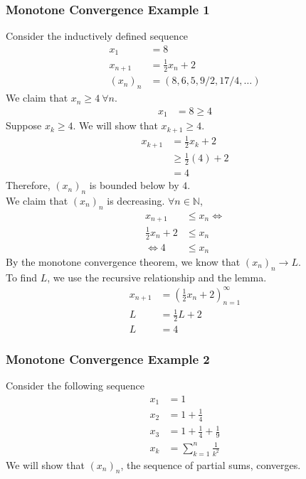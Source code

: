 \documentclass[10pt]{extarticle}
\newcommand{\N}{\mathbb{N}}
\begin{document}
    \subsubsection{Monotone Convergence Example 1}%
    Consider the inductively defined sequence
    \begin{align*}
      x_{1} &= 8\\
      x_{n+1} &= \frac{1}{2}x_n + 2\\
      (x_n)_n &= (8,6,5,9/2,17/4,\dots)
    \end{align*}
    We claim that $x_n \geq 4~\forall n$.
    \begin{align*}
      x_1 &= 8 \geq 4
    \end{align*}
    Suppose $x_k \geq 4$. We will show that $x_{k+1} \geq 4$.
    \begin{align*}
      x_{k + 1} &= \frac{1}{2}x_k + 2\\
                &\geq \frac{1}{2}(4) + 2\\
                &= 4
    \end{align*}
    Therefore, $(x_n)_n$ is bounded below by $4$.\\

    We claim that $(x_n)_n$ is decreasing. $\forall n\in\N$,
    \begin{align*}
      x_{n+1} &\leq x_n
      \Leftrightarrow \\
      \frac{1}{2}x_n + 2 &\leq x_n\\
      \Leftrightarrow
      4 &\leq x_n
    \end{align*}
    By the monotone convergence theorem, we know that $(x_n)_n\rightarrow L$.\\

    To find $L$, we use the recursive relationship and the lemma.
    \begin{align*}
      x_{n+1} &= \left(\frac{1}{2}x_n + 2\right)_{n=1}^{\infty}\\
      L &= \frac{1}{2}L + 2\\
      L &= 4
    \end{align*}
    \subsubsection{Monotone Convergence Example 2}%
    Consider the following sequence
    \begin{align*}
      x_1 &= 1\\
      x_2 &= 1 + \frac{1}{4}\\
      x_3 &= 1 + \frac{1}{4} + \frac{1}{9}\\
      x_{k} &= \sum_{k=1}^{n} \frac{1}{k^2}
    \end{align*}
    We will show that $(x_n)_n$, the sequence of partial sums, converges.\\
\end{document}
